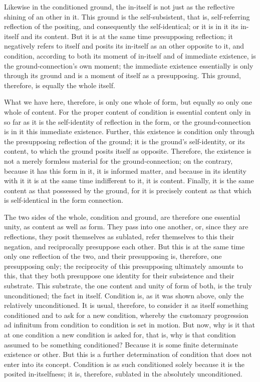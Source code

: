 Likewise in the conditioned ground, the in-itself is not
just as the reflective shining of an other in it.
This ground is the self-subsistent,
that is, self-referring reflection of the positing,
and consequently the self-identical;
or it is in it its in-itself and its content.
But it is at the same time presupposing reflection;
it negatively refers to itself
and posits its in-itself as an other opposite to it,
and condition, according to both its moment of in-itself
and of immediate existence, is
the ground-connection's own moment;
the immediate existence essentially is only through its ground
and is a moment of itself as a presupposing.
This ground, therefore, is equally the whole itself.

What we have here, therefore, is only one whole of form,
but equally so only one whole of content.
For the proper content of condition is essential content
only in so far as it is the self-identity of reflection in the form,
or the ground-connection is in it this immediate existence.
Further, this existence is condition only through
the presupposing reflection of the ground;
it is the ground's self-identity, or its content,
to which the ground posits itself as opposite.
Therefore, the existence is not a merely
formless material for the ground-connection;
on the contrary, because it has this form in it, it is informed matter,
and because in its identity with it it is at the same time
indifferent to it, it is content.
Finally, it is the same content as that possessed by the ground,
for it is precisely content as that which is self-identical
in the form connection.

The two sides of the whole,
condition and ground,
are therefore one essential unity,
as content as well as form.
They pass into one another,
or, since they are reflections,
they posit themselves as sublated,
refer themselves to this their negation,
and reciprocally presuppose each other.
But this is at the same time only one reflection of the two,
and their presupposing is, therefore, one presupposing only;
the reciprocity of this presupposing ultimately amounts to this,
that they both presuppose one identity
for their subsistence and their substrate.
This substrate, the one content and unity of form of both,
is the truly unconditioned; the fact in itself.
Condition is, as it was shown above, only the relatively unconditioned.
It is usual, therefore, to consider it as itself something conditioned
and to ask for a new condition,
whereby the customary progression ad infinitum
from condition to condition is set in motion.
But now, why is it that at one condition
a new condition is asked for, that is,
why is that condition assumed to be something conditioned?
Because it is some finite determinate existence or other.
But this is a further determination of condition
that does not enter into its concept.
Condition is as such conditioned solely because
it is the posited in-itselfness;
it is, therefore, sublated in the absolutely unconditioned.

